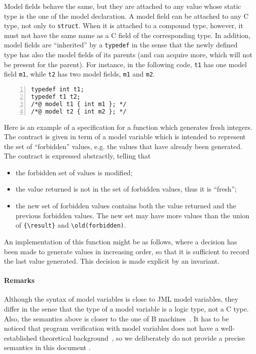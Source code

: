 Model fields behave the same, but they are attached to any value whose static
type is the one of the model declaration. A model field can be attached to any
C type, not only to \texttt{struct}. When it is attached to a compound type,
however, it must not have the same name as a C field of the corresponding type.
In addition, model fields are ``inherited'' by a \texttt{typedef} 
in the sense that the newly defined type has also the model fields of its
parents (and can acquire more, which will not be present for the parent).
For instance, in the following code, \texttt{t1} has one model field
\texttt{m1}, while \texttt{t2} has two model fields,
\texttt{m1} and \texttt{m2}.
\begin{lstlisting}[style=c,basicstyle=\lp@basic,numbers=left]
typedef int t1;
typedef t1 t2;
/*@ model t1 { int m1 }; */
/*@ model t2 { int m2 }; */
\end{lstlisting}

\begin{example}\label{ex:model}
  Here is an example of a specification for a function which generates
  fresh integers. The contract is given in term of a model variable
  which is intended to represent the set of ``forbidden'' values,
  e.g. the values that have already been generated.
  The contract is expressed abstractly, telling that
  \begin{itemize}
  \item the forbidden set of values is modified;
  \item the value returned is not in the set of forbidden values, thus
    it is ``fresh'';
  \item the new set of forbidden values contains both the value
    returned and the previous forbidden values.
    The new set may have more values than the union of \lstinline|{\result}| 
    and \lstinline|\old(forbidden)|.
  \end{itemize}
  An implementation of this function might be as follows, where a
  decision has been made to generate values in increasing order, so
  that it is sufficient to record the last value generated. This decision
  is made explicit by an invariant.
\end{example}

\paragraph{Remarks}

Although the syntax of model variables is close to JML model
variables, they differ in the sense that the type of a model variable
is a logic type, not a C type. Also, the semantics above is closer to
the one of B machines~\cite{abrial96:_b_book}. It has to be noticed
that program verification with model variables does not have a
well-established theoretical background~\cite{marche07,leavens07}, so
we deliberately do not provide a precise semantics in this document .

